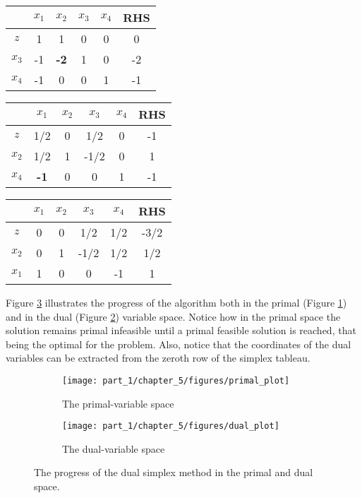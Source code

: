 
\begin{center}
	\begin{tabular}{c|cccc|c}
		 & $x_1$ & $x_2$ & $x_3$ & $x_4$ & RHS \\ \hline 
		$z$  &  1 & 1 & 0 & 0 & 0  \\ \hline
	   $x_3$ & -1 &\textbf{-2} & 1 & 0 & -2 \\
	   $x_4$ & -1 & 0 & 0 & 1 & -1 \\\hline \hline
	\end{tabular}
	
	\begin{tabular}{c|cccc|c}
		 & $x_1$ & $x_2$ & $x_3$ & $x_4$ & RHS \\ \hline 
		$z$  & 1/2 & 0 & 1/2 & 0 & -1  \\ \hline
	   $x_2$ & 1/2 & 1 & -1/2 & 0 & 1 \\
	   $x_4$ & \textbf{-1} & 0 & 0 & 1 & -1 \\ \hline \hline 
	\end{tabular}
	
	\begin{tabular}{c|cccc|c}
		 & $x_1$ & $x_2$ & $x_3$ & $x_4$ & RHS \\ \hline 
		$z$  & 0 & 0 & 1/2 & 1/2 & -3/2  \\ \hline
	   $x_2$ & 0 & 1 & -1/2 & 1/2 & 1/2 \\
	   $x_1$ & 1 & 0 & 0 & -1 & 1 \\ \hline 
	\end{tabular}
\end{center}

Figure \ref{p1c5:fig:ex1} illustrates the progress of the algorithm both in the primal (Figure \ref{p1c5:fig:ex1_P}) and in the dual (Figure \ref{p1c5:fig:ex1_D}) variable space. Notice how in the primal space the solution remains primal infeasible until a primal feasible solution is reached, that being the optimal for the problem. Also, notice that the coordinates of the dual variables can be extracted from the zeroth row of the simplex tableau.

\begin{figure}[h]
	\centering
	\begin{subfigure}{0.45\textwidth}
		\centering
		\texttt{[image: part\_1/chapter\_5/figures/primal\_plot]}
		\caption{The primal-variable space}\label{p1c5:fig:ex1_P}
	\end{subfigure}
	\begin{subfigure}{0.45\textwidth}
		\centering
		\texttt{[image: part\_1/chapter\_5/figures/dual\_plot]}
		\caption{The dual-variable space}\label{p1c5:fig:ex1_D}
	\end{subfigure}
	\caption{The progress of the dual simplex method in the primal and dual space.}	\label{p1c5:fig:ex1}
\end{figure}

